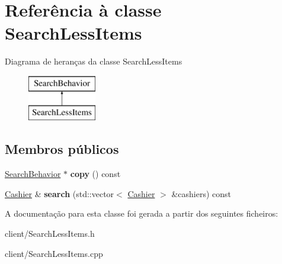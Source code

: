 \hypertarget{classSearchLessItems}{\section{Referência à classe Search\-Less\-Items}
\label{df/d53/classSearchLessItems}
}
Diagrama de heranças da classe Search\-Less\-Items\begin{figure}[H]
\begin{center}
\leavevmode
\includegraphics[height=2.000000cm]{df/d53/classSearchLessItems}
\end{center}
\end{figure}
\subsection*{Membros públicos}
\begin{DoxyCompactItemize}
\item 
\hypertarget{classSearchLessItems_a0f6334a5f52e56e6ee2ae2b40f4bf93a}{\hyperlink{classSearchBehavior}{Search\-Behavior} $\ast$ {\bfseries copy} () const }\label{df/d53/classSearchLessItems_a0f6334a5f52e56e6ee2ae2b40f4bf93a}

\item 
\hypertarget{classSearchLessItems_adc465fca95f9abee198f0aca23501369}{\hyperlink{classCashier}{Cashier} \& {\bfseries search} (std\-::vector$<$ \hyperlink{classCashier}{Cashier} $>$ \&cashiers) const }\label{df/d53/classSearchLessItems_adc465fca95f9abee198f0aca23501369}

\end{DoxyCompactItemize}


A documentação para esta classe foi gerada a partir dos seguintes ficheiros\-:\begin{DoxyCompactItemize}
\item 
client/Search\-Less\-Items.\-h\item 
client/Search\-Less\-Items.\-cpp\end{DoxyCompactItemize}
